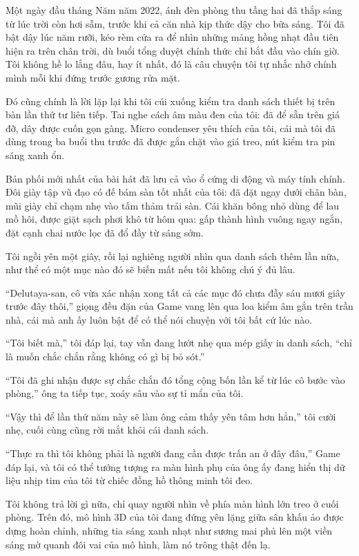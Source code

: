 ﻿\documentclass[../main.tex]{subfiles}
\begin{document}
Một ngày đầu tháng Năm năm 2022, ánh đèn phòng thu tầng hai đã thắp sáng từ lúc trời còn hơi sẫm, trước khi cả căn nhà kịp thức dậy cho bữa sáng. Tôi đã bật dậy lúc năm rưỡi, kéo rèm cửa ra để nhìn những mảng hồng nhạt đầu tiên hiện ra trên chân trời, dù buổi tổng duyệt chính thức chỉ bắt đầu vào chín giờ. Tôi không hề lo lắng đâu, hay ít nhất, đó là câu chuyện tôi tự nhắc nhở chính mình mỗi khi đứng trước gương rửa mặt.

Đó cũng chính là lời lặp lại khi tôi cúi xuống kiểm tra danh sách thiết bị trên bàn lần thứ tư liên tiếp. Tai nghe cách âm màu đen của tôi: đã để sẵn trên giá đỡ, dây được cuốn gọn gàng. Micro condenser yêu thích của tôi, cái mà tôi đã dùng trong ba buổi thu trước đã được gắn chặt vào giá treo, nút kiểm tra pin sáng xanh ổn.

Bản phối mới nhất của bài hát đã lưu cả vào ổ cứng di động và máy tính chính. Đôi giày tập vũ đạo có đế bám sàn tốt nhất của tôi: đã đặt ngay dưới chân bàn, mũi giày chỉ chạm nhẹ vào tấm thảm trải sàn. Cái khăn bông nhỏ dùng để lau mồ hôi, được giặt sạch phơi khô từ hôm qua: gấp thành hình vuông ngay ngắn, đặt cạnh chai nước lọc đã đổ đầy từ sáng sớm.

Tôi ngồi yên một giây, rồi lại nghiêng người nhìn qua danh sách thêm lần nữa, như thể có một mục nào đó sẽ biến mất nếu tôi không chú ý đủ lâu.

``Delutaya-san, cô vừa xác nhận xong tất cả các mục đó chưa đầy sáu mươi giây trước đây thôi,'' giọng đều đặn của Game vang lên qua loa kiểm âm gắn trên trần nhà, cái mà anh ấy luôn bật để có thể nói chuyện với tôi bất cứ lúc nào.

``Tôi biết mà,'' tôi đáp lại, tay vẫn đang lướt nhẹ qua mép giấy in danh sách, ``chỉ là muốn chắc chắn rằng không có gì bị bỏ sót.''

``Tôi đã ghi nhận được sự chắc chắn đó tổng cộng bốn lần kể từ lúc cô bước vào phòng,'' ông ta tiếp tục, xoáy sâu vào sự tỉ mẩn của tôi.

``Vậy thì để lần thứ năm này sẽ làm ông cảm thấy yên tâm hơn hẳn,'' tôi cười nhẹ, cuối cùng cũng rời mắt khỏi cái danh sách.

``Thực ra thì tôi không phải là người đang cần được trấn an ở đây đâu,'' Game đáp lại, và tôi có thể tưởng tượng ra màn hình phụ của ông ấy đang hiển thị dữ liệu nhịp tim của tôi từ chiếc đồng hồ thông minh tôi đeo.

Tôi không trả lời gì nữa, chỉ quay người nhìn về phía màn hình lớn treo ở cuối phòng. Trên đó, mô hình 3D của tôi đang đứng yên lặng giữa sân khấu ảo được dựng hoàn chỉnh, những tia sáng xanh nhạt như sương mai phủ lên một viền sáng mờ quanh đôi vai của mô hình, làm nó trông thật đến lạ.
\end{document}
